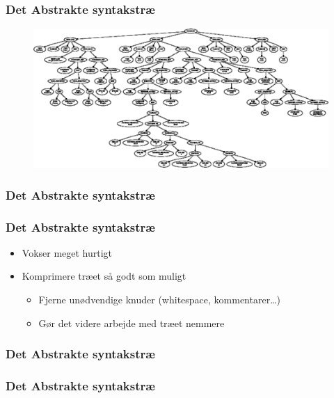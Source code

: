 \begin{frame}
  \frametitle{Det Abstrakte syntakstræ}

  \begin{figure}
    \includegraphics[width=1.0\linewidth]{billeder/ast}
  \end{figure}
\end{frame}

\begin{frame}
  \frametitle{Det Abstrakte syntakstræ}
 
  
  
  
\end{frame}

\begin{frame}
  \frametitle{Det Abstrakte syntakstræ}

  \begin{itemize}
    \item Vokser meget hurtigt
    \item Komprimere træet så godt som muligt
      \begin{itemize}
        \item Fjerne unødvendige knuder (whitespace, kommentarer\ldots)
        \item Gør det videre arbejde med træet nemmere
      \end{itemize}
  \end{itemize}
\end{frame}

\begin{frame}
  \frametitle{Det Abstrakte syntakstræ}

  

\end{frame}

\begin{frame}
  \frametitle{Det Abstrakte syntakstræ}

  

\end{frame}

